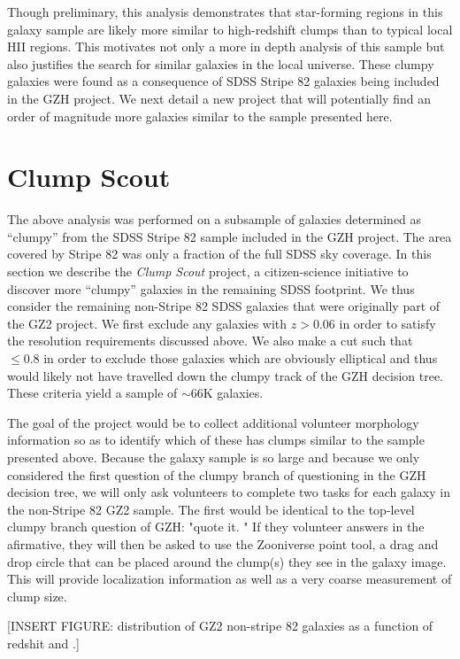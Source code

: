 Though preliminary, this analysis demonstrates that star-forming regions in this galaxy sample are likely more similar to high-redshift clumps than to typical local HII regions. This motivates not only a more in depth analysis of this sample but also justifies the search for similar galaxies in the local universe. These clumpy galaxies were found as a consequence of SDSS Stripe 82 galaxies being included in the GZH project. We next detail a new project that will potentially find an order of magnitude more galaxies similar to the sample presented here.

\section{Clump Scout}
The above analysis was performed on a subsample of galaxies determined as ``clumpy'' from the SDSS Stripe 82 sample included in the GZH project. The area covered by Stripe 82 was only a fraction of the full SDSS sky coverage. In this section we describe the \textit{Clump Scout} project, a citizen-science initiative to discover more ``clumpy'' galaxies in the remaining SDSS footprint. We thus consider the remaining non-Stripe 82 SDSS galaxies that were originally part of the GZ2 project. We first exclude any galaxies with $z>0.06$ in order to satisfy the resolution requirements discussed above. We also make a cut such that \fsmooth~$\le0.8$ in order to exclude those galaxies which are obviously elliptical and thus would likely not have travelled down the clumpy track of the GZH decision tree. These criteria yield a sample of $\sim66$K galaxies. 

The goal of the project would be to collect additional volunteer morphology information so as to identify which of these has clumps similar to the sample presented above. Because the galaxy sample is so large and because we only considered the first question of the clumpy branch of questioning in the GZH decision tree, we will only ask volunteers to complete two tasks for each galaxy in the non-Stripe 82 GZ2 sample. The first would be identical to the top-level clumpy branch question of GZH: "quote it. " If they volunteer answers in the afirmative, they will then be asked to use the Zooniverse point tool, a drag and drop circle that can be placed around the clump(s) they see in the galaxy image. This will provide localization information as well as a very coarse measurement of clump size. 

[INSERT FIGURE: distribution of GZ2 non-stripe 82 galaxies as a function of redshit and \fsmooth.]


